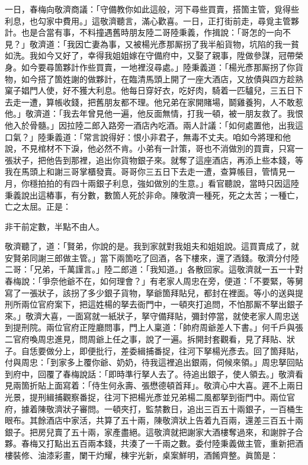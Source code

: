 一日，春梅向敬濟商議：「守備教你如此這般，河下尋些買賣，搭箇主管，覓得些利息，也勾家中費用。」這敬濟聽言，滿心歡喜。一日，正打街前走，尋覓主管夥計。也是合當有事，不料撞遇舊時朋友陸二哥陸秉義，作揖說：「哥怎的一向不見？」敬濟道：「我因亡妻為事，又被楊光彥那厮拐了我半船貨物，坑陷的我一貧如洗。我如今又好了，幸得我姐姐嫁在守備府中，又娶了親事，陞做參謀，冠帶榮身。如今要尋箇夥計作些買賣，一地裡沒尋處。」陸秉義道：「楊光彥那厮拐了你貨物，如今搭了箇姓謝的做夥計，在臨清馬頭上開了一座大酒店，又放債與四方趁熟窠子娼門人使，好不獲大利息。他每日穿好衣，吃好肉，騎着一匹驢兒，三五日下去走一遭，算帳收錢，把舊朋友都不理。{}他兄弟在家開賭場，鬬雞養狗，人不敢惹他。」敬濟道：「我去年曾見他一遍，他反面無情，打我一頓，被一朋友救了。我恨他入於骨髓。」因拉陸二郎入路旁一酒店內吃酒。兩人計議：「如何處置他，出我這口氣？」陸秉義道：「常言說得好：恨小非君子，無毒不丈夫。咱如今將理和他說，不見棺材不下淚，他必然不肯。小弟有一計策，哥也不消做別的買賣，只寫一張狀子，把他告到那裡，追出你貨物銀子來。就奪了這座酒店，再添上些本錢，等我在馬頭上和謝三哥掌櫃發賣。哥哥你三五日下去走一遭，查算帳目，管情見一月，你穩拍拍的有四十兩銀子利息，強如做別的生意。」{}看官聽說，當時只因這陸秉義說出這樁事，有分數，數箇人死於非命。陳敬濟一種死，死之太苦；一種亡，亡之太屈。正是：

\begin{myquote}
非干前定數，半點不由人。
\end{myquote}

敬濟聽了，道：「賢弟，你說的是。我到家就對我姐夫和姐姐說。這買賣成了，就安賢弟同謝三郎做主管。」當下兩箇吃了回酒，各下樓來，還了酒錢。敬濟分付陸二哥：「兄弟，千萬謹言。」陸二郎道：「我知道。」各散回家。這敬濟就一五一十對春梅說：「爭奈他爺不在，如何理會？」有老家人周忠在旁，便道：「不要緊，等舅寫了一張狀子，該拐了多少銀子貨物，拏爺箇拜貼兒，都封在裡面。等小的送與提刑所兩位官府案下，把這姓楊的拏去衙門中，一頓夾打追問，不怕那厮不拏出銀子來。」{}敬濟大喜，一面寫就一紙狀子，拏守備拜貼，彌封停當，就使老家人周忠送到提刑院。兩位官府正陞廳問事，門上人稟道：「帥府周爺差人下書。」何千戶與張二官府喚周忠進見，問周爺上任之事，說了一遍。拆開封套觀看，見了拜貼、狀子。自恁要做分上，即便批行，差委緝捕番捉，往河下拏楊光彥去。回了箇拜貼，付與周忠：「到家多上覆你爺、奶奶，待我這裡追出銀兩，伺候來領。」周忠拏回貼到府中，回覆了春梅說話：「即時準行拏人去了。待追出銀子，使人領去。」敬濟看見兩箇折貼上面寫着：「侍生何永壽、張懋德頓首拜」。敬濟心中大喜。遲不上兩日光景，提刑緝捕觀察番捉，往河下把楊光彥並兄弟楊二風都拏到衙門中。兩位官府，據着陳敬濟狀子審問。一頓夾打，監禁數日，追出三百五十兩銀子，一百桶生眼布。其餘酒店中家活，共算了五十兩，陳敬濟狀上告着九百兩，還差三百五十兩銀子。把房兒賣了五十兩，家產盡絕。這敬濟就把謝家大酒樓奪過來，和謝胖子合夥。春梅又打點出五百兩本錢，共湊了一千兩之數。委付陸秉義做主管，重新把酒樓裝修、油漆彩畫，闌干灼耀，棟宇光新，桌案鮮明，酒餚齊整。眞箇是：

